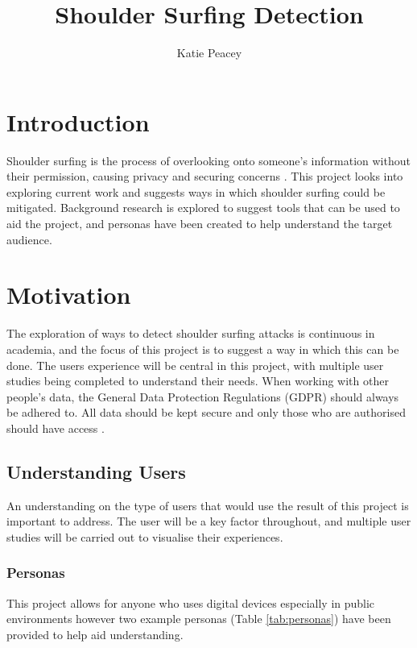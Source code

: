\documentclass[12pt]{article}
\title{ Shoulder Surfing Detection}
\author{Katie Peacey}
\theoremstyle{plain}
\theoremstyle{definition}
\begin{document}
\maketitle

\tableofcontents

\listoffigures
\listoftables
\clearpage


\section{Introduction}
\label{sec:intro}

Shoulder surfing is the process of overlooking onto someone’s information without their permission, causing privacy and securing concerns \cite{eiband_understanding_2017}. This project looks into exploring current work and suggests ways in which shoulder surfing could be mitigated. Background research is explored to suggest tools that can be used to aid the project, and personas have been created to help understand the target audience.

\section{Motivation}
\label{sec:motivation} 

The exploration of ways to detect shoulder surfing attacks is continuous in academia, and the focus of this project is to suggest a way in which this can be done. The users experience will be central in this project, with multiple user studies being completed to understand their needs.
When working with other people's data, the General Data Protection Regulations (GDPR) \cite{noauthor_data_nodate} should always be adhered to. All data should be kept secure and only those who are authorised should have access \cite{noauthor_data_nodate}.

\subsection{Understanding Users}
An understanding on the type of users that would use the result of this project is important to address. The user will be a key factor throughout, and multiple user studies will be carried out to visualise their experiences.

\subsubsection{Personas}
This project allows for anyone who uses digital devices especially in public environments however two example personas (Table \ref{tab:personas}) have been provided to help aid understanding.
\end{document}
